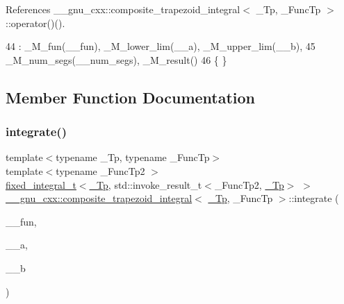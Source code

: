 References \+\_\+\+\_\+gnu\+\_\+cxx\+::composite\+\_\+trapezoid\+\_\+integral$<$ \+\_\+\+Tp, \+\_\+\+Func\+Tp $>$\+::operator()().


\begin{DoxyCode}
44       : \_M\_fun(\_\_fun), \_M\_lower\_lim(\_\_a), \_M\_upper\_lim(\_\_b),
45         \_M\_num\_segs(\_\_num\_segs), \_M\_result()
46       \{ \}
\end{DoxyCode}


\subsection{Member Function Documentation}
\mbox{\label{class____gnu__cxx_1_1composite__trapezoid__integral_a8897329b7ae73a8e41028519fab78b81}} 
\subsubsection{\texorpdfstring{integrate()}{integrate()}}
{\footnotesize\ttfamily template$<$typename \+\_\+\+Tp, typename \+\_\+\+Func\+Tp$>$ \\
template$<$typename \+\_\+\+Func\+Tp2 $>$ \\
\hyperlink{struct____gnu__cxx_1_1fixed__integral__t}{fixed\+\_\+integral\+\_\+t}$<$\hyperlink{namespace____gnu__cxx_a3b19a9c800ca194374ef9172290f7d79}{\+\_\+\+Tp}, std\+::invoke\+\_\+result\+\_\+t$<$\+\_\+\+Func\+Tp2, \hyperlink{namespace____gnu__cxx_a3b19a9c800ca194374ef9172290f7d79}{\+\_\+\+Tp}$>$ $>$ \hyperlink{class____gnu__cxx_1_1composite__trapezoid__integral}{\+\_\+\+\_\+gnu\+\_\+cxx\+::composite\+\_\+trapezoid\+\_\+integral}$<$ \hyperlink{namespace____gnu__cxx_a3b19a9c800ca194374ef9172290f7d79}{\+\_\+\+Tp}, \+\_\+\+Func\+Tp $>$\+::integrate (\begin{DoxyParamCaption}\item[{\+\_\+\+Func\+Tp2}]{\+\_\+\+\_\+fun,  }\item[{\hyperlink{namespace____gnu__cxx_a3b19a9c800ca194374ef9172290f7d79}{\+\_\+\+Tp}}]{\+\_\+\+\_\+a,  }\item[{\hyperlink{namespace____gnu__cxx_a3b19a9c800ca194374ef9172290f7d79}{\+\_\+\+Tp}}]{\+\_\+\+\_\+b }\end{DoxyParamCaption})\hspace{0.3cm}{\ttfamily [inline]}}



